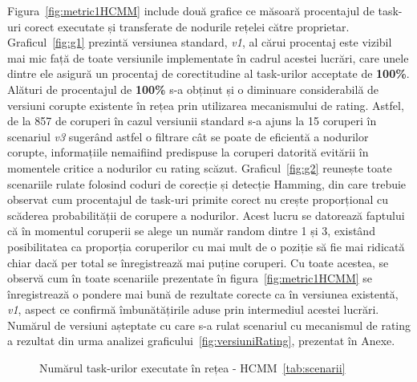 \documentclass[12pt,a4paper]{report}
\begin{document}
Figura~\ref{fig:metric1HCMM} include două grafice ce măsoară procentajul de task-uri corect executate și transferate de nodurile rețelei către proprietar. Graficul~\ref{fig:g1} prezintă versiunea standard, \textit{v1}, al cărui procentaj este vizibil mai mic față de toate versiunile implementate în cadrul acestei lucrări, care unele dintre ele asigură un procentaj de corectitudine al task-urilor acceptate de \textbf{100\%}. Alături de procentajul de \textbf{100\%} s-a obținut și o diminuare considerabilă de versiuni corupte existente în rețea prin utilizarea mecanismului de rating. Astfel, de la 857 de coruperi în cazul versiunii standard s-a ajuns la 15 coruperi în scenariul \textit{v3} sugerând astfel o filtrare cât se poate de eficientă a nodurilor corupte, informațiile nemaifiind predispuse la coruperi datorită evitării în momentele critice a nodurilor cu rating scăzut. Graficul~\ref{fig:g2} reunește toate scenariile rulate folosind coduri de corecție și detecție Hamming, din care trebuie observat cum procentajul de task-uri primite corect nu crește proporțional cu scăderea probabilității de corupere a nodurilor. Acest lucru se datorează faptului că în momentul coruperii se alege un număr random dintre 1 și 3, existând posibilitatea ca proporția coruperilor cu mai mult de o poziție să fie mai ridicată chiar dacă per total se înregistrează mai puține coruperi. Cu toate acestea, se observă cum în toate scenariile prezentate în figura~\ref{fig:metric1HCMM} se înregistrează o pondere mai bună de rezultate corecte ca în versiunea existentă, \textit{v1}, aspect ce confirmă îmbunătățirile aduse prin intermediul acestei lucrări. Numărul de versiuni așteptate cu care s-a rulat scenariul cu mecanismul de rating a rezultat din urma analizei graficului~\ref{fig:versiuniRating}, prezentat în Anexe.

\begin{figure}%
    \centering
    \qquad
    \caption{Numărul task-urilor executate în rețea - HCMM~\ref{tab:scenarii}}%
    \label{fig:metric2HCMM}%
\end{figure}
\end{document}
